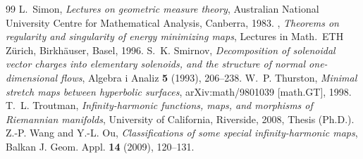 \documentclass[10pt,a4paper]{amsart}
\begin{document}
\begin{thebibliography}{99}
 L.~Simon, \emph{Lectures on geometric measure theory}, Australian National University Centre for Mathematical Analysis, Canberra, 1983.
 \bysame, \emph{Theorems on regularity and singularity of energy minimizing maps}, Lectures in Math.~ETH Z\"urich, Birkh\"auser, Basel, 1996.
 S.~K. Smirnov, \emph{Decomposition of solenoidal vector charges into elementary solenoids, and the structure of normal one-dimensional flows}, Algebra i Analiz \textbf{5} (1993), 206--238.
 W.~P. Thurston, \emph{Minimal stretch maps between hyperbolic surfaces}, arXiv:math/9801039 [math.GT], 1998.
 T.~L. Troutman, \emph{Infinity-harmonic functions, maps, and morphisms of {R}iemannian manifolds}, University of California, Riverside, 2008, Thesis (Ph.D.).
 Z.-P. Wang and Y.-L. Ou, \emph{Classifications of some special infinity-harmonic maps}, Balkan J. Geom. Appl. \textbf{14} (2009), 120--131.
\end{thebibliography}
\end{document}
